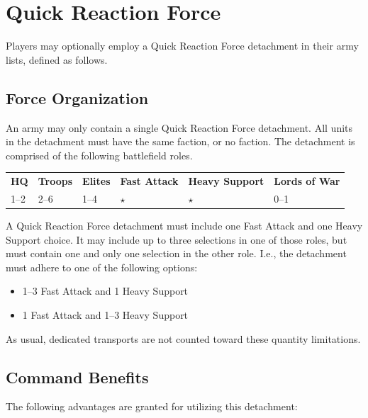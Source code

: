 \documentclass{novanarrative}
\begin{document}
\section{Quick Reaction Force}

Players may optionally employ a Quick Reaction Force detachment in
their army lists, defined as follows.

\subsection{Force Organization}

An army may only contain a single Quick Reaction Force detachment.
All units in the detachment must have the same faction, or no faction.
The detachment is comprised of the following battlefield roles.

\begin{center}
\begin{tabular}{C{0.75in}C{0.75in}C{0.75in}C{0.75in}C{0.75in}C{0.75in}}
\textbf{\color{white} HQ}	& \textbf{\color{white} Troops}	& \textbf{\color{white} Elites}	& \textbf{\color{white} Fast Attack}	& \textbf{\color{white} Heavy Support}	& \textbf{\color{white} Lords of War}\\
1--2	& 2--6	& 1--4	& $\star$	& $\star$	& 0--1\\
\end{tabular}
\end{center}

A Quick Reaction Force detachment must include one Fast Attack and one
Heavy Support choice. It may include up to three selections in one of
those roles, but must contain one and only one selection in the other
role. I.e., the detachment must adhere to one of the following
options:

\begin{itemize}
\item 1--3 Fast Attack and 1 Heavy Support
\item 1 Fast Attack and 1--3 Heavy Support
\end{itemize}

As usual, dedicated transports are not counted toward these quantity limitations.

\subsection{Command Benefits}

The following advantages are granted for utilizing this detachment:
\end{document}
